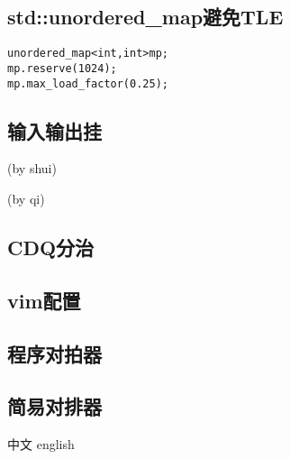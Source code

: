 \documentclass{ctexart}
\begin{document}
\subsection{std::unordered\_map避免TLE}
\begin{lstlisting}
unordered_map<int,int>mp;
mp.reserve(1024);
mp.max_load_factor(0.25);
\end{lstlisting}
\subsection{输入输出挂}
(by shui)

(by qi)

\subsection{CDQ分治}

\subsection{vim配置}

\subsection{程序对拍器}

\subsection{简易对排器}




中文 english
\end{document}
